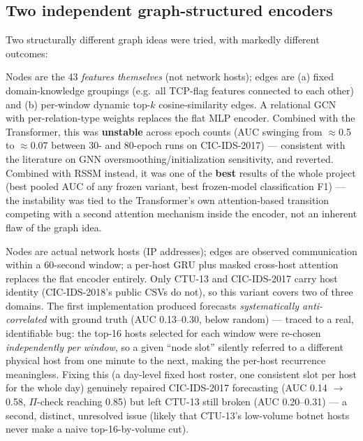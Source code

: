 \documentclass[11pt]{article}
\begin{document}
\subsection{Two independent graph-structured encoders}\label{sec:graphs}

Two structurally different graph ideas were tried, with markedly different outcomes:

\begin{description}[leftmargin=1.5em,style=nextline]
  \item[Feature-level graph (GraFT-inspired).] Nodes are the 43 \emph{features themselves}
  (not network hosts); edges are (a) fixed domain-knowledge groupings (e.g.\ all TCP-flag
  features connected to each other) and (b) per-window dynamic top-$k$ cosine-similarity edges.
  A relational GCN with per-relation-type weights replaces the flat MLP encoder. Combined with
  the Transformer, this was \textbf{unstable} across epoch counts (AUC swinging from
  $\approx$0.5 to $\approx$0.07 between 30- and 80-epoch runs on CIC-IDS-2017) --- consistent
  with the literature on GNN oversmoothing/initialization sensitivity, and reverted. Combined
  with RSSM instead, it was one of the \textbf{best} results of the whole project (best pooled
  AUC of any frozen variant, best frozen-model classification F1) --- the instability was tied
  to the Transformer's own attention-based transition competing with a second attention
  mechanism inside the encoder, not an inherent flaw of the graph idea.
  \item[Host-communication graph (G-RSSM, arXiv:2604.14811).] Nodes are actual network hosts
  (IP addresses); edges are observed communication within a 60-second window; a per-host GRU
  plus masked cross-host attention replaces the flat encoder entirely. Only CTU-13 and
  CIC-IDS-2017 carry host identity (CIC-IDS-2018's public CSVs do not), so this variant covers
  two of three domains. The first implementation produced forecasts \emph{systematically
  anti-correlated} with ground truth (AUC 0.13--0.30, below random) --- traced to a real,
  identifiable bug: the top-16 hosts selected for each window were re-chosen \emph{independently
  per window}, so a given ``node slot'' silently referred to a different physical host from one
  minute to the next, making the per-host recurrence meaningless. Fixing this (a day-level
  fixed host roster, one consistent slot per host for the whole day) genuinely repaired
  CIC-IDS-2017 forecasting (AUC 0.14 $\to$ 0.58, $\Pi$-check reaching 0.85) but left CTU-13 still
  broken (AUC 0.20--0.31) --- a second, distinct, unresolved issue (likely that CTU-13's
  low-volume botnet hosts never make a naive top-16-by-volume cut).
\end{description}
\end{document}
